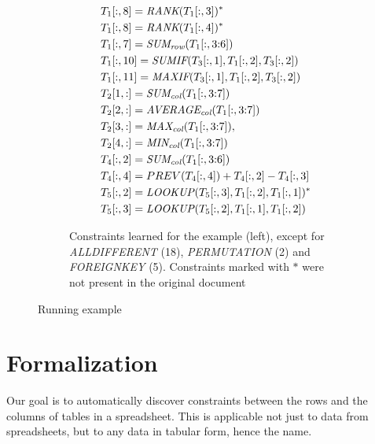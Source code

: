 \documentclass{IEEEtran}
\newcommand{\range}[3]{\ensuremath{#1[#2,#3]}}
\newcommand{\rangeto}[2]{#1{:}#2}
\newcommand{\rangeall}{:}
\newcommand{\eccalc}[2]{\ensuremath{#1 = #2}}
\newcommand{\ecrank}[2]{\eccalc{#1}{\textit{RANK}(#2)}}
\newcommand{\eclookupf}[4]{\ensuremath{\textit{LOOKUP}_{\textit{#4}}(#1, #2, #3)}}
\newcommand{\eclookup}[4]{\eccalc{#1}{\eclookupf{#2}{#3}{#4}{}}}
\newcommand{\ecaggc}[3]{\eccalc{#2}{\textit{#1\textsubscript{col}}(#3)}}
\newcommand{\ecsumc}[2]{\eccalc{#1}{\textit{SUM\textsubscript{col}}(#2)}}
\newcommand{\ecsumr}[2]{\eccalc{#1}{\textit{SUM\textsubscript{row}}(#2)}}
\newcommand{\ecaggif}[5]{\eccalc{#2}{\textit{#1IF}(#3, #4, #5)}}
\theoremstyle{definition}
\begin{document}
\begin{figure}[thb]
\begin{subfigure}{.34\textwidth}
{\begin{align*}
      &~\ecrank{\range{T_{1}}{\rangeall}{8}}{\range{T_{1}}{\rangeall}{3}}^*\\
      &~\ecrank{\range{T_{1}}{\rangeall}{8}}{\range{T_{1}}{\rangeall}{4}}^* \\
%
      &~\ecsumr{\range{T_{1}}{\rangeall}{7}}{\range{T_{1}}{\rangeall}{\rangeto{3}{6}}} \\
%
      &~\ecaggif{\textit{SUM}}{\range{T_{1}}{\rangeall}{10}}{\range{T_{3}}{\rangeall}{1}}{\range{T_{1}}{\rangeall}{2}}{\range{T_{3}}{\rangeall}{2}} \\
%
      &~\ecaggif{\textit{MAX}}{\range{T_{1}}{\rangeall}{11}}{\range{T_{3}}{\rangeall}{1}}{\range{T_{1}}{\rangeall}{2}}{\range{T_{3}}{\rangeall}{2}} \\
%
      &~\ecsumc{\range{T_{2}}{1}{\rangeall}}{\range{T_{1}}{\rangeall}{\rangeto{3}{7}}} \\
%
      &~\ecaggc{\textit{AVERAGE}}{\range{T_{2}}{2}{\rangeall}}{\range{T_{1}}{\rangeall}{\rangeto{3}{7}}} \\
%
      &~\ecaggc{\textit{MAX}}{\range{T_{2}}{3}{\rangeall}}{\range{T_{1}}{\rangeall}{\rangeto{3}{7}}},  \\
%
      &~\ecaggc{\textit{MIN}}{\range{T_{2}}{4}{\rangeall}}{\range{T_{1}}{\rangeall}{\rangeto{3}{7}}} \\
%
      &~\ecsumc{\range{T_{4}}{\rangeall}{2}}{\range{T_{1}}{\rangeall}{\rangeto{3}{6}}} \\
%
      &~\range{T_{4}}{\rangeall}{4} = PREV(\range{T_{4}}{\rangeall}{4}) + \range{T_{4}}{\rangeall}{2} - \range{T_{4}}{\rangeall}{3} \\
%
      &~\eclookup{\range{T_{5}}{\rangeall}{2}}{\range{T_{5}}{\rangeall}{3}}{\range{T_{1}}{\rangeall}{2}}{\range{T_{1}}{\rangeall}{1}}^* \\
%
      &~\eclookup{\range{T_{5}}{\rangeall}{3}}{\range{T_{5}}{\rangeall}{2}}{\range{T_{1}}{\rangeall}{1}}{\range{T_{1}}{\rangeall}{2}}
    \end{align*}}
  \vspace{-18pt}
  \caption{Constraints learned for the example (left), except for \textit{ALLDIFFERENT} (18), \textit{PERMUTATION} (2) and \textit{FOREIGNKEY} (5).
  Constraints marked with $*$ were not present in the original document}
  \label{fig:sol_example}
\end{subfigure}
  \caption{Running example}
\end{figure}


\section{Formalization}\label{sec:formalization}
Our goal is to automatically discover constraints between the rows and the columns of tables in a spreadsheet. This is applicable not just to data from spreadsheets, but to any data in tabular form, hence the name.
\end{document}
